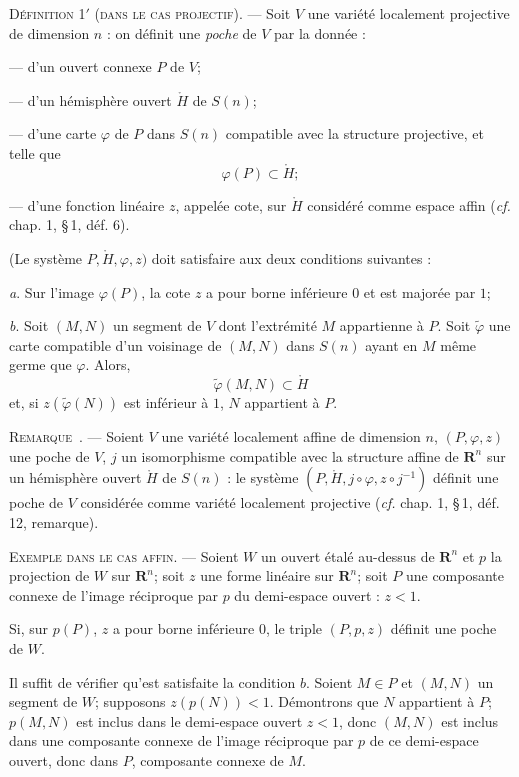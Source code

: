 \documentclass[11pt]{article}
\newcommand{\R}{\boldsymbol{R}}
\newcommand{\bzcf}[2]{#1}
\newcommand{\bznum}[1]{\if\relax\detokenize{#1}\relax\else\ #1\fi}
\newenvironment{defin}[1][]{\par\medskip\noindent\textsc{Définition #1.} --- }{\par\medskip}
\newenvironment{remarque}[1][]{\par\medskip\noindent\textsc{Remarque\bznum{#1}.} --- }{\par\medskip}
\newenvironment{exemple}[1][Exemple]{\par\medskip\noindent\textsc{#1.} --- }{\par\medskip}
\begin{document}
\begin{defin}[1$'$ (dans le cas projectif)]
Soit $V$ une variété localement projective de dimension $n$ : on définit une \textit{poche} de
$V$ par la donnée :

--- d'un ouvert connexe $P$ de $V$;

--- d'un hémisphère ouvert $\mathring{H}$ de $S(n)$;

--- d'une carte $\varphi$ de $P$ dans $S(n)$ compatible avec la structure projective, et telle
que
\[ \varphi(P)\subset\mathring{H}; \]

--- d'une fonction linéaire $z$, appelée cote, sur $\mathring{H}$ considéré comme espace affin
(\bzcf{\textit{cf.} chap. 1, \S\,1, déf. 6}{\ref{bzdef:c1s1d6_structure_affine_hemisphere}}).

(Le système $P, \mathring{H}, \varphi, z)$ doit satisfaire aux deux conditions suivantes :

\textit{a}. Sur l'image $\varphi(P)$, la cote $z$ a pour borne inférieure $0$ et est majorée par
$1$;

\textit{b}. Soit $(M, N)$ un segment de $V$ dont l'extrémité $M$ appartienne à $P$. Soit
$\tilde{\varphi}$ une carte compatible d'un voisinage de $(M, N)$ dans $S(n)$ ayant en $M$ même
germe que $\varphi$. Alors,
\[ \tilde{\varphi}(M, N)\subset\mathring{H} \]
et, si $z(\tilde{\varphi}(N))$ est inférieur à $1$, $N$ appartient à $P$.
\end{defin}

\begin{remarque}
Soient $V$ une variété localement affine de dimension $n$, $(P, \varphi, z)$ une poche de $V$, $j$
un isomorphisme compatible avec la structure affine de $\R^n$ sur un hémisphère ouvert
$\mathring{H}$ de $S(n)$ : le système $(P, \mathring{H}, j\circ\varphi, z\circ j^{-1})$ définit
une poche de $V$ considérée comme variété localement projective (\bzcf{\textit{cf.} chap. 1,
\S\,1, déf. 12, remarque}{\ref{bzrem:c1s1r1_affine_vers_projective}}).
\end{remarque}

\begin{exemple}[Exemple dans le cas affin]
Soient $W$ un ouvert étalé au-dessus de $\R^n$ et $p$ la projection de $W$ sur $\R^n$; soit $z$
une forme linéaire sur $\R^n$; soit $P$ une composante connexe de l'image réciproque par $p$ du
demi-espace ouvert : $z<1$.

Si, sur $p(P)$, $z$ a pour borne inférieure $0$, le triple $(P, p, z)$ définit une poche de $W$.

Il suffit de vérifier qu'est satisfaite la condition $b$. Soient $M\in P$ et $(M, N)$ un segment
de $W$; supposons $z(p(N))<1$. Démontrons que $N$ appartient
à $P$; $p(M, N)$ est inclus dans le demi-espace ouvert $z<1$, donc $(M, N)$ est inclus dans une
composante connexe de l'image réciproque par $p$ de ce demi-espace ouvert, donc dans $P$,
composante connexe de $M$.
\end{exemple}
\end{document}
